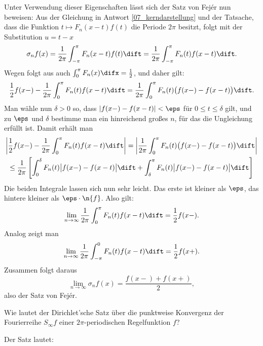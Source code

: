 \begin{antwort}
    \medskip
    \noindent
    Unter Verwendung dieser Eigenschaften lässt sich der Satz von Fej\'er 
    nun beweisen: Aus der Gleichung in Antwort \ref{07_kerndarstellung} und 
    der Tatsache, dass die Funktion $t\mapsto F_n(x-t) f(t)$ die Periode 
    $2\pi $ besitzt, folgt mit der Substitution $u=t-x$
    \[
    \sigma_n f(x) = \frac{1}{2\pi} \int_{-\pi}^\pi F_n(x-t) f(t) \dift 
    = \frac{1}{2\pi} \int_{-\pi}^\pi F_n(t) f(x-t) \dift.
    \] 
    Wegen  folgt aus  auch 
    $\int_0^\pi F_n(x) \difx = \frac{1}{2}$, und daher gilt:
    \[
    \frac{1}{2} 
    f(x-)-\frac{1}{2\pi} \int _0^\pi F_n(t) f(x-t)\dift 
    = \frac{1}{2\pi} \int_0^\pi F_n(t) \bigl( f(x-)-f(x-t) \bigr) \dift.
    \]
    Man wähle nun $\delta>0$ so, dass $| f(x-)-f(x-t) | < \eps$ für 
    $0 \le t \le \delta $ gilt, und zu $\eps$ und $\delta$ bestimme man ein 
    hinreichend großes $n$, für das die Ungleichung {\astref} erfüllt 
    ist. Damit erhält man 
    \begin{multline}
      \left| \frac{1}{2} 
        f(x-)-\frac{1}{2\pi} \int _0^\pi F_n(t) f(x-t)\dift \right| 
      = \left| 
        \frac{1}{2\pi} \int_0^\pi F_n(t) \bigl( f(x-)-f(x-t) \bigr) \dift
      \right|
      \\
      \le \frac{1}{2\pi} \left[ \int_0^\delta F_n(t) \big| f(x-)-f(x-t) \big| \dift
        + \int_\delta^\pi F_n(t) \big| f(x-)-f(x-t) \big| \dift \right]
      \notag
    \end{multline}  
    Die beiden Integrale lassen sich nun sehr leicht. Das erste 
    ist kleiner als $\eps$, das hintere kleiner als 
    $\eps \cdot \n{f}$. Also gilt:
    \[ 
    \lim_{n\to\infty} \frac{1}{2\pi} \int_0^\pi F_n(t) f(x-t)\dift =  
    \frac{1}{2} f(x-).
    \]
    Analog zeigt man
    \[ 
    \lim_{n\to\infty}  \frac{1}{2\pi} \int_{-\pi}^0 F_n(t) f(x-t)\dift =
    \frac{1}{2} f(x+).
    \]
    Zusammen folgt daraus
    \[
    \lim_{n\to \infty}  \sigma_n f(x) = \frac{f(x-)+f(x+)}{2},
    \]
    also der Satz von Fej\'er. \AntEnd
  \end{antwort}

  \begin{frage}
    Wie lautet der Dirichlet'sche Satz über die punktweise Konvergenz der  
    Fourierreihe $S_\infty f$ einer $2\pi$-periodischen Regelfunktion 
    $f$? 
  \end{frage}

  \begin{antwort}
    Der Satz lautet: 

    \medskip
    \noindent{}\AntEnd
  \end{antwort}

